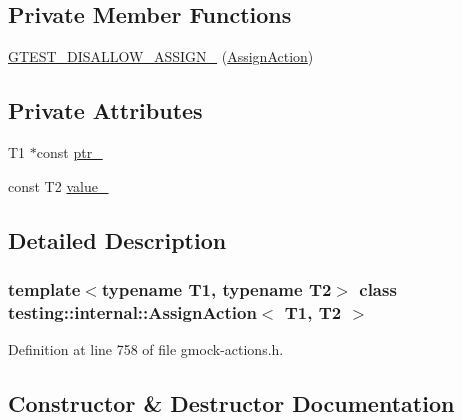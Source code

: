 \subsection*{Private Member Functions}
\begin{DoxyCompactItemize}
\item 
\hyperlink{classtesting_1_1internal_1_1AssignAction_af69bcf574c5453e4120fc770d604ddaa}{G\+T\+E\+S\+T\+\_\+\+D\+I\+S\+A\+L\+L\+O\+W\+\_\+\+A\+S\+S\+I\+G\+N\+\_\+} (\hyperlink{classtesting_1_1internal_1_1AssignAction}{Assign\+Action})
\end{DoxyCompactItemize}
\subsection*{Private Attributes}
\begin{DoxyCompactItemize}
\item 
T1 $\ast$const \hyperlink{classtesting_1_1internal_1_1AssignAction_a49cdab549c200ecac64b348ba27b9d06}{ptr\+\_\+}
\item 
const T2 \hyperlink{classtesting_1_1internal_1_1AssignAction_a6b76b6b0b0483f2918dab3f2df960dce}{value\+\_\+}
\end{DoxyCompactItemize}


\subsection{Detailed Description}
\subsubsection*{template$<$typename T1, typename T2$>$\newline
class testing\+::internal\+::\+Assign\+Action$<$ T1, T2 $>$}



Definition at line 758 of file gmock-\/actions.\+h.



\subsection{Constructor \& Destructor Documentation}
\mbox{\label{classtesting_1_1internal_1_1AssignAction_ae5a8fe8954ff3f8b26a08b57c3afdf9a}} 
